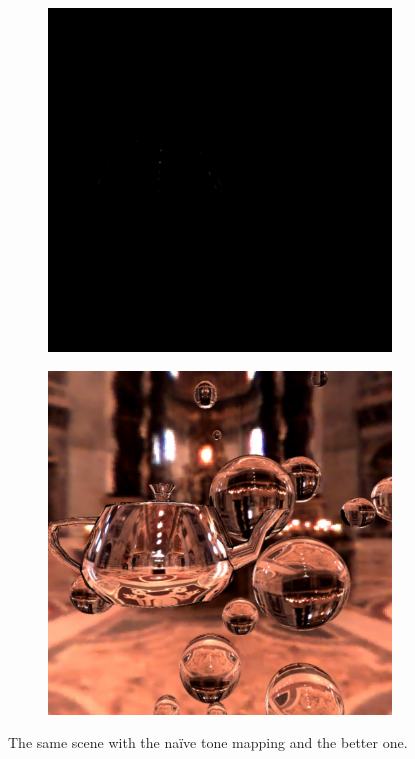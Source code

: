 \documentclass[acmsmall]{acmart}
\begin{document}
\begin{figure}[h]
    \centering
    
\begin{subfigure}{.5\textwidth}
  \centering
  \includegraphics[width=.9\linewidth]{img/withouttone.png}
\end{subfigure}%
\begin{subfigure}{.5\textwidth}
  \centering
  \includegraphics[width=.9\linewidth]{img/withtone.png}
\end{subfigure} 
    
    \caption{The same scene with the naïve tone mapping and the better one. }
    \label{fig:tone}
\end{figure}
\end{document}
